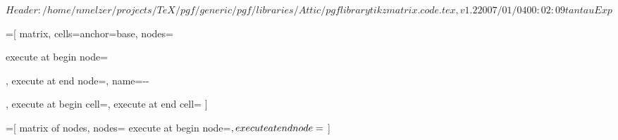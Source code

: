%
%
%

\ProvidesFileRCS[v\pgfversion] $Header: /home/nmelzer/projects/TeX/pgf/generic/pgf/libraries/Attic/pgflibrarytikzmatrix.code.tex,v 1.2 2007/01/04 00:02:09 tantau Exp $



=[%
   matrix,%
   cells={anchor=base},%
   nodes={%
     execute at begin node=\strut,%
     execute at end node=,
     name=\tikzmatrixname-\the\pgfmatrixcurrentrow-\the\pgfmatrixcurrentcolumn%
   },
   execute at begin cell=\tikz@lib@matrix@start@cell,%
   execute at end cell=\tikz@lib@matrix@end@cell%
]

\newif\iftikz@lib@matrix@plain

\def\tikz@lib@matrix@start@cell{\pgfutil@ifnextchar\let{\tikz@lib@matrix@check}{\tikz@lib@matrix@plainfalse\node\bgroup}}%

\def\tikz@lib@matrix@check#1{%
  \pgfutil@ifnextchar\tikz@signal@path{\tikz@lib@matrix@plaintrue\let}{\tikz@lib@matrix@plainfalse\node\bgroup\let}%
}
  
\def\tikz@lib@matrix@end@cell{%
  \iftikz@lib@matrix@plain%
  \else%
    \expandafter\egroup\expandafter;%
  \fi%
}


=[%
  matrix of nodes,
  nodes={%
   execute at begin node=$\mathstrut,%
   execute at end node=$%
  }%
]








\def\tikz@delimiter#1#2#3#4#5#6#7#8{%
  \bgroup
    \pgfextra{\let\tikz@save@last@fig@name=\tikz@last@fig@name}%
    node[outer sep=0pt,inner sep=0pt,draw=none,fill=none,anchor=#1,at=(\tikz@last@fig@name.#2),#3]
    {%
      {\nullfont\pgf@process{\pgfpointdiff{\pgfpointanchor{\tikz@last@fig@name}{#4}}{\pgfpointanchor{\tikz@last@fig@name}{#5}}}}%
      $\left#6\vcenter{\hrule height .5#8 depth .5#8 width0pt}\right#7$%
    }
    \pgfextra{\global\let\tikz@last@fig@name=\tikz@save@last@fig@name}%
  \egroup%
}

\endinput
